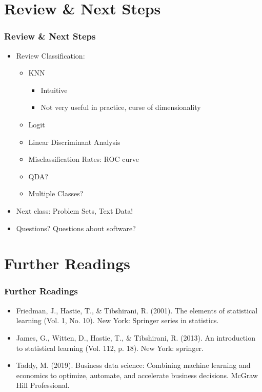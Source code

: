 \documentclass[
  shownotes,
  xcolor={svgnames},
  hyperref={colorlinks,citecolor=DarkBlue,linkcolor=DarkRed,urlcolor=DarkBlue}
  , aspectratio=169]{beamer}
\begin{document}
\section{Review
 \& Next Steps}
\begin{frame}
\frametitle{Review \& Next Steps}
  
\begin{itemize} 
    \item Review Classification:
    \medskip
    \begin{itemize} 
      \item KNN
        \begin{itemize}  
            \item Intuitive
            \item Not very useful in practice, curse of dimensionality
        \end{itemize}      
     \medskip   
    \item Logit
    \medskip
  \item Linear Discriminant Analysis
  \medskip
  \item  Misclassification Rates: ROC curve
  \medskip
  \item QDA?
  \medskip 
  \item Multiple Classes?

    \end{itemize}
    \bigskip  
  \item  Next class:  Problem Sets, Text Data!


\bigskip  
\item Questions? Questions about software? 

\end{itemize}
\end{frame}
\section{Further Readings}
\begin{frame}
\frametitle{Further Readings}

\begin{itemize}


  \item Friedman, J., Hastie, T., \& Tibshirani, R. (2001). The elements of statistical learning (Vol. 1, No. 10). New York: Springer series in statistics.
  \medskip
  \item James, G., Witten, D., Hastie, T., \& Tibshirani, R. (2013). An introduction to statistical learning (Vol. 112, p. 18). New York: springer.
  \medskip
  \item Taddy, M. (2019). Business data science: Combining machine learning and economics to optimize, automate, and accelerate business decisions. McGraw Hill Professional.
  
  
\end{itemize}

\end{frame}






\end{document}
